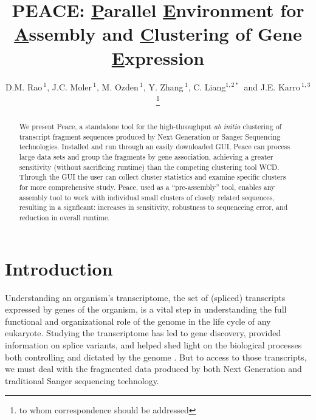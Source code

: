 \documentclass[a4,center,fleqn]{NAR}
\begin{document}
\title{PEACE: {\underline P}arallel {\underline E}nvironment for {\underline A}ssembly
  and {\underline C}lustering of Gene {\underline E}xpression}

\author{D.M. Rao\,$^{1}$, J.C. Moler\,$^{1}$, M. Ozden\,$^1$, Y. Zhang\,$^{1}$,
  C. Liang$^{1,2*}$\, and J.E. Karro\,$^{1,3}$\footnote{to whom
    correspondence should be addressed}}

\address{$^1$ Department of Computer Science and Software Engineering, \\
  $^2$ Department of Botany, \\
  $^3$ and Department of Microbiology, Miami University, Oxford, Ohio,
  USA}




\maketitle

\begin{abstract}
  We present {\sc Peace}, a standalone tool for the high-throughput
  {\it ab initio} clustering of transcript fragment sequences produced
  by Next Generation or Sanger Sequencing technologies.  Installed and
  run through an easily downloaded GUI, {\sc Peace} can process large
  data sets and group the fragments by gene association, achieving a
  greater sensitivity (without sacrificing runtime) than the competing
  clustering tool {\sc WCD}.  Through the GUI the user can collect
  cluster statistics and examine specific clusters for more
  comprehensive study.  {\sc Peace}, used as a ``pre-assembly'' tool,
  enables any assembly tool to work with individual small clusters of
  closely related sequences, resulting in a signficant: increases in
  sensitivity, robustness to sequenceing error, and reduction in
  overall runtime.
\end{abstract}


\section{Introduction}

Understanding an organism's transcriptome, the set of (spliced)
transcripts expressed by genes of the organism, is a vital step in
understanding the full functional and organizational role of the
genome in the life cycle of any eukaryote.  Studying the transcriptome
has led to gene discovery, provided information on splice variants,  
and helped shed light on the biological processes both controlling and
dictated by the genome \cite{Nagaraj07}.  But to access to those
transcripts, we must deal with the fragmented data produced by
both Next Generation and traditional Sanger sequencing technology.
\end{document}
